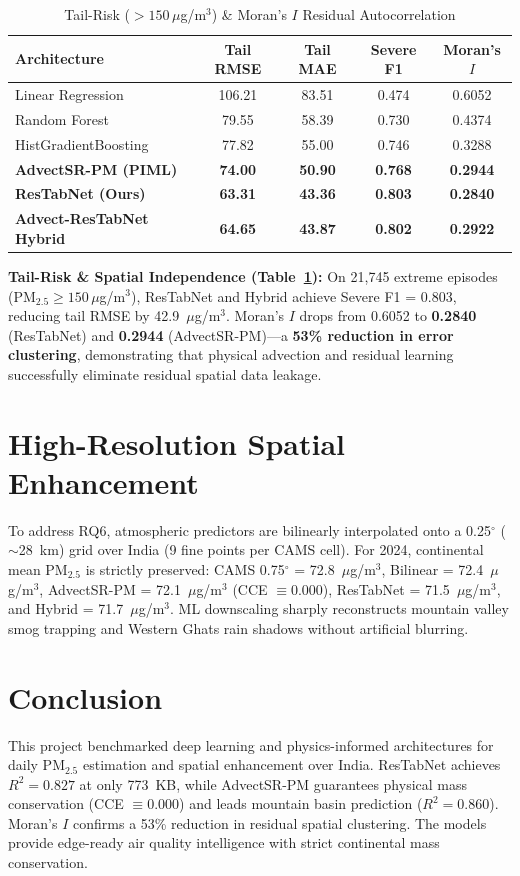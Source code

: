 \documentclass[conference]{IEEEtran}
\begin{document}
\begin{table}[t]
\caption{Tail-Risk ($>150\,\mu$g/m$^3$) \& Moran's $I$ Residual Autocorrelation}
\centering
\begin{tabular}{lcccc}
\toprule
\textbf{Architecture} & \textbf{Tail RMSE} & \textbf{Tail MAE} & \textbf{Severe F1} & \textbf{Moran's $I$} \\
\midrule
Linear Regression & 106.21 & 83.51 & 0.474 & 0.6052 \\
Random Forest & 79.55 & 58.39 & 0.730 & 0.4374 \\
HistGradientBoosting & 77.82 & 55.00 & 0.746 & 0.3288 \\
\textbf{AdvectSR-PM (PIML)} & \textbf{74.00} & \textbf{50.90} & \textbf{0.768} & \textbf{0.2944} \\
\textbf{ResTabNet (Ours)} & \textbf{63.31} & \textbf{43.36} & \textbf{0.803} & \textbf{0.2840} \\
\textbf{Advect-ResTabNet Hybrid} & \textbf{64.65} & \textbf{43.87} & \textbf{0.802} & \textbf{0.2922} \\
\bottomrule
\end{tabular}
\label{tab:tail}
\end{table}

\textbf{Tail-Risk \& Spatial Independence (Table~\ref{tab:tail}):} On 21,745 extreme episodes (PM$_{2.5} \ge 150\,\mu$g/m$^3$), ResTabNet and Hybrid achieve Severe F1 = 0.803, reducing tail RMSE by 42.9~$\mu$g/m$^3$. Moran's $I$ drops from 0.6052 to \textbf{0.2840} (ResTabNet) and \textbf{0.2944} (AdvectSR-PM)---a \textbf{53\% reduction in error clustering}, demonstrating that physical advection and residual learning successfully eliminate residual spatial data leakage.

\section{High-Resolution Spatial Enhancement}
To address RQ6, atmospheric predictors are bilinearly interpolated onto a 0.25$^\circ$ ($\sim$28~km) grid over India (9 fine points per CAMS cell). For 2024, continental mean PM$_{2.5}$ is strictly preserved: CAMS 0.75$^\circ$ = 72.8~$\mu$g/m$^3$, Bilinear = 72.4~$\mu$g/m$^3$, AdvectSR-PM = 72.1~$\mu$g/m$^3$ (CCE $\equiv 0.000$), ResTabNet = 71.5~$\mu$g/m$^3$, and Hybrid = 71.7~$\mu$g/m$^3$. ML downscaling sharply reconstructs mountain valley smog trapping and Western Ghats rain shadows without artificial blurring.

\section{Conclusion}
This project benchmarked deep learning and physics-informed architectures for daily PM$_{2.5}$ estimation and spatial enhancement over India. ResTabNet achieves $R^2 = 0.827$ at only 773~KB, while AdvectSR-PM guarantees physical mass conservation (CCE $\equiv 0.000$) and leads mountain basin prediction ($R^2 = 0.860$). Moran's $I$ confirms a 53\% reduction in residual spatial clustering. The models provide edge-ready air quality intelligence with strict continental mass conservation.
\end{document}

